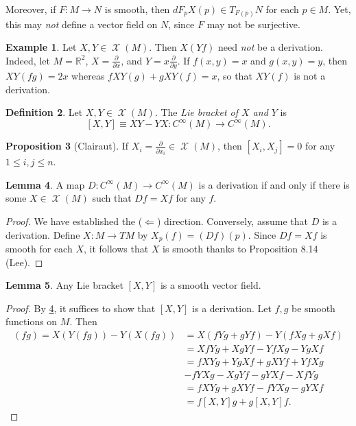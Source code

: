 \documentclass[10pt,letterpaper,cm]{nupset}
\theoremstyle{definition}
\newtheorem{definition}{Definition}[subsection]
\newtheorem{exmp}[definition]{Example}
\theoremstyle{theorem}
\newtheorem{lemma}[definition]{Lemma}
\newtheorem{prop}[definition]{Proposition}
\theoremstyle{remark}
\newcommand{\R}{\mathbb R}
\newcommand{\1}{\mathbf{1}}
\newcommand{\0}{\vec 0}
\DeclareMathOperator{\vf}{\mathscr{X}}
\begin{document}
\medskip

 Moreover, if $F: M \to N$ is smooth, then $dF_pX(p) \in T_{F(p)}N$ for each $p \in M$. Yet, this may \emph{not} define a vector field on $N$, since $F$ may not be surjective.


\begin{exmp}
Let $X, Y \in \vf(M)$. Then $X(Yf)$ need \emph{not} be a derivation. Indeed, let $M= \R^2$, $X= \frac{\partial}{\partial{x}}$, and $Y = x \frac{\partial}{\partial{y}}$. If $f(x,y)=x$ and $g(x, y) = y$, then $XY(fg) = 2x$ whereas $fXY(g) + gXY(f) = x$, so that $XY(f)$ is not a derivation.
\end{exmp}

\begin{definition}
Let $X, Y \in \vf(M)$. The \textit{Lie bracket of $X$ and $Y$} is $$[X, Y] \equiv  XY - YX : C^{\infty}(M)\to C^{\infty}(M).$$
\end{definition}

\begin{prop}[Clairaut]
If $X_i = \frac{\partial}{\partial{x_i}}\in \vf(M)$, then $\left[X_i, X_j\right] = 0$ for any $1\leq i,j \leq n$.
\end{prop}

\begin{lemma}\label{deriv}
A map $D: C^{\infty}(M) \to C^{\infty}(M)$ is a derivation if and only if there is some $X \in \vf(M)$ such that $Df = Xf$ for any $f$.
\end{lemma}
\begin{proof}
We have established the ($\Longleftarrow$) direction. Conversely, assume that $D$ is a derivation. Define $X : M \to TM$ by $X_p(f) = (Df)(p)$. Since $Df = Xf$ is smooth for each $X$, it follows that $X$ is smooth thanks to Proposition 8.14 (Lee).
\end{proof}

\begin{lemma}
Any Lie bracket $[X, Y]$ is a smooth vector field.
\end{lemma}
\begin{proof}
By \cref{deriv}, it suffices to show that $[X, Y]$ is a derivation. Let $f, g$ be smooth functions on $M$. Then
\begin{align*}
 [X, Y](fg) = X(Y(fg)) - Y(X(fg)) & =  X(fYg + gYf) - Y(fXg + gXf) 
 \\ & = XfYg + XgYf - YfXg - YgXf 
 \\ & = fXYg + YgXf + gXYf + YfXg 
 \\ & - fYXg - XgYf - gYXf - XfYg 
 \\ & = fXYg + gXYf - fYXg - gYXf 
 \\ & = f[X,Y]g + g[X,Y]f
.\end{align*}
\end{proof}
\end{document}
